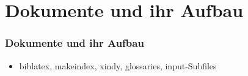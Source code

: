 \section{Dokumente und ihr Aufbau}

\begin{frame}
  \frametitle{Dokumente und ihr Aufbau}
  \begin{itemize}
  \item biblatex, makeindex, xindy, glossaries, input-Subfiles
  \end{itemize}
\end{frame}
